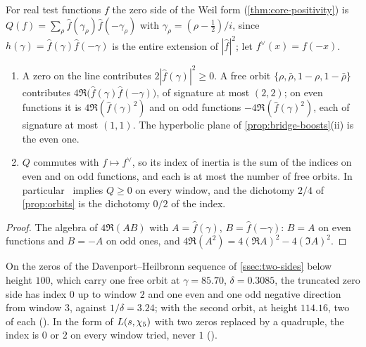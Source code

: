 \begin{proposition}\label{prop:free-orbit-index}
For real test functions $f$ the zero side of the Weil form (\cref{thm:core-positivity}) is
$Q(f)=\sum_\rho\hat f(\gamma_\rho)\hat f(-\gamma_\rho)$ with
$\gamma_\rho=(\rho-\tfrac12)/i$, since $h(\gamma)=\hat f(\gamma)\hat f(-\gamma)$ is the entire extension of $|\hat f|^2$; let $f^\vee(x)=f(-x)$.
\begin{enumerate}[label=\textup{(\roman*)}]
  \item A zero on the line contributes $2|\hat f(\gamma)|^2\ge0$.  A free orbit
    $\{\rho,\bar\rho,1-\rho,1-\bar\rho\}$ contributes $4\Re\bigl(\hat f(\gamma)\hat f(-\gamma)\bigr)$, of signature
    at most $(2,2)$; on even functions it is $4\Re(\hat f(\gamma)^2)$ and on odd functions
    $-4\Re(\hat f(\gamma)^2)$, each of signature at most $(1,1)$.  The hyperbolic plane of
    \cref{prop:bridge-boosts}\textup{(ii)} is the even one.
  \item $Q$ commutes with $f\mapsto f^\vee$, so its index of inertia is the sum of the indices on even and
    on odd functions, and each is at most the number of free orbits.  In particular \Ecore\ implies
    $Q\ge0$ on every window, and the dichotomy $2/4$ of \cref{prop:orbits} is the dichotomy $0/2$ of the index.
\end{enumerate}

\end{proposition}
\begin{proof}
The algebra of $4\Re(AB)$ with $A=\hat f(\gamma)$, $B=\hat f(-\gamma)$: $B=A$ on even functions and $B=-A$ on
odd ones, and $4\Re(A^2)=4(\Re A)^2-4(\Im A)^2$.
\end{proof}
On the zeros of the Davenport--Heilbronn sequence of \cref{ssec:two-sides} below height $100$, which carry one
free orbit at $\gamma=85.70$, $\delta=0.3085$, the truncated zero side has index $0$ up to window $2$ and one even and
one odd negative direction from window $3$, against $1/\delta=3.24$; with the second orbit, at height $114.16$,
two of each ().  In the form of $L(s,\chi_5)$ with two zeros replaced by a quadruple, the index is $0$ or $2$ on every window tried, never $1$ ().

